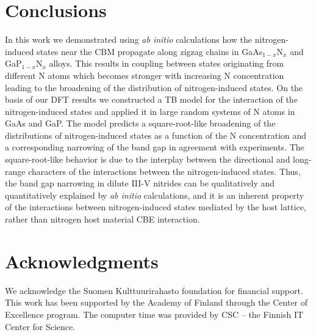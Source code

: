 \documentclass[aps,prb,10pt,twocolumn,groupedaddress]{revtex4-1}
\begin{document}
\section{Conclusions}
\label{sec:conclusions}
In this work we demonstrated using \textit{ab initio} calculations 
how the nitrogen-induced states near the CBM propagate along zigzag chains in 
GaAs$_{1-x}$N$_x$ and GaP$_{1-x}$N$_x$ alloys. This results in coupling between
states originating from different N atoms which becomes stronger with 
increasing N concentration leading to the broadening of the distribution of 
nitrogen-induced states. On the basis of our DFT results we constructed a TB 
model for the interaction of the nitrogen-induced 
states and applied it in large random
systems of N atoms in GaAs and GaP. The model predicts a square-root-like
broadening of the distributions of nitrogen-induced states as a 
function of the N 
concentration and a corresponding narrowing of the band gap in agreement with
experiments. The square-root-like behavior is due to the interplay between the
directional and long-range characters of the interactions between the 
nitrogen-induced states. Thus, the band gap 
narrowing in dilute III-V nitrides can be qualitatively and quantitatively 
explained by \textit{ab initio} calculations, and it is an 
inherent property of the interactions between nitrogen-induced states 
mediated by the host lattice, rather than nitrogen host material CBE
interaction.

\section{Acknowledgments}
We acknowledge the Suomen Kulttuurirahasto foundation
for financial support. This work has been supported by
the Academy of Finland through the Center of Excellence program. 
The computer time was provided by CSC -- the Finnish IT Center
for Science.

\appendix*
\end{document}
